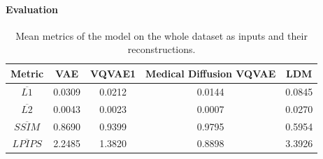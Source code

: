 \paragraph{Evaluation}\mbox{}
\begin{table}[h!]
\centering
\begin{tabular}{|c|c|c|c|c|}
\hline
\textbf{Metric} & VAE & VQVAE1 & Medical Diffusion VQVAE & \textbf{LDM} \\
\hline
$\overline{L1}$ & 0.0309 & 0.0212 & 0.0144 & 0.0845 \\
\hline
$\overline{L2}$ & 0.0043 & 0.0023 & 0.0007 & 0.0270 \\
\hline
$\overline{SSIM}$ & 0.8690 & 0.9399 & 0.9795 & 0.5954 \\
\hline
$\overline{LPIPS}$ & 2.2485 & 1.3820 & 0.8898 & 3.3926 \\
\hline
\end{tabular}
\caption{Mean metrics of the model on the whole dataset as inputs and their reconstructions.}
\label{table:metrics}
\end{table}